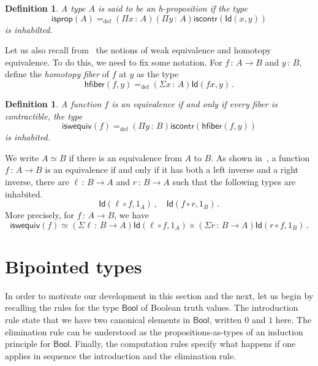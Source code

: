 \documentclass[10pt,a4paper,oneside,reqno]{amsart}
\theoremstyle{mythm}
\theoremstyle{mydef}
\newtheorem{definition}[theorem]{Definition}
\theoremstyle{myrmk}
\newcommand{\ie}{\text{i.e.\ }}
\newcommand{\defeq}{=_{\mathrm{def}}}
\newcommand{\co}{\,{:}\,}
\newcommand{\hfiber}{\mathsf{hfiber}}
\newcommand{\iscontr}{\mathsf{iscontr}}
\newcommand{\isprop}{\mathsf{isprop}}
\newcommand{\iswequiv}{\mathsf{iswequiv}}
\newcommand{\Bool}{\mathsf{Bool}}
\newcommand{\Id}{\mathsf{Id}}
\begin{document}
\begin{definition} A type $A$ is said to be an \emph{h-proposition} if the type
\[
\isprop(A) \defeq (\Pi x \co A)(\Pi  y \co A) \iscontr( \Id(x,y)) 
\]
is inhabilted.
\end{definition}

Let us also recall from~\cite{VoevodskyV:unifc} the notions of weak equivalence and homotopy equivalence. To do this, we need to fix some notation. For $f \co A \rightarrow B$ and $y \co B$, define the \emph{homotopy fiber} of $f$ at $y$ as the type
\[
 \hfiber(f,y) \defeq (\Sigma x \co A) \Id(f x, y) \, .
\]


\begin{definition} A function $f$ is  an \emph{equivalence} if and only if every fiber is contractible, \ie the type
\[
 \iswequiv(f) \defeq (\Pi y \co B)  \iscontr(\hfiber(f,y)) 
\]
is inhabited. 
\end{definition}

 We write $A\simeq B$ if there is an equivalence from $A$ to $B$.   As shown in~\cite{HoTT}, a function $f \co A \rightarrow B$ is an equivalence if and only if  it has both a left inverse and a right inverse, \ie there are 
$\ell \co B \to A$ and $r \co B \to A$ such that the following types are inhabited. 
\[
 \Id(\ell \circ f, 1_A)\, ,  \quad  \Id(f \circ r, 1_B) \, .
 \] 
More precisely, for $f \co A \rightarrow B$, we have
 \[ 
 \textstyle
 \iswequiv(f) \simeq (\Sigma \ell \co B \to A) \Id( \ell \circ f, 1_A) \times (\Sigma r \co B \to A) \Id( r \circ f , 1_B) \, .
 \]



\newpage

\section{Bipointed types}
\label{sec:bip}

In order to motivate our development in this section and the next, 
let us begin by recalling the rules for the type $\Bool$ of Boolean truth values. The introduction rule state that we have two canonical elements in $\Bool$, written $0$ and $1$ here. The elimination rule can be understood as the propositions-as-types of an induction principle for $\Bool$. Finally, the computation rules specify what happens if one applies in sequence the introduction and the elimination rule.
\end{document}
